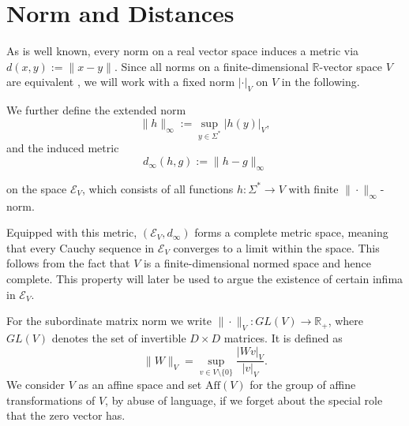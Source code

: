 \section{Norm and Distances}
\label{ND}



As is well known, every norm on a real vector space induces a metric via \( d(x, y) := \|x - y\| \).  
Since all norms on a finite-dimensional \(\mathbb{R}\)-vector space \(V\) are equivalent \cite{lang_algebra_2002}, we will work with a fixed norm \(|\cdot|_V\) on \(V\) in the following.



We further define the extended norm
\[
\|h\|_\infty := \sup_{y \in \Sigma^*} |h(y)|_V,
\]
and the induced metric
\[
d_\infty(h, g) := \|h - g\|_\infty
\]

on the space \(\mathcal{E}_V\), which consists of all functions \(h : \Sigma^* \to V\) with finite \(\|\cdot\|_\infty\)-norm.

Equipped with this metric, \((\mathcal{E}_V, d_\infty)\) forms a complete metric space, meaning that every Cauchy sequence in \(\mathcal{E}_V\) converges to a limit within the space.  
This follows from the fact that \(V\) is a finite-dimensional normed space and hence complete.
This property will later be used to argue the existence of certain infima in \(\mathcal{E}_V\).



For the subordinate matrix norm we write $\|\cdot\|_V: GL(V) \rightarrow \mathbb{R}_+$, where $GL(V)$ denotes the set of invertible $D\times D $ matrices.
It is defined as \[\|W\|_V=\sup_{v\in V\setminus \{0\}}\frac{|W v|_V}{|v|_V}.\]
We consider $V$ as an affine space and set $\text{Aff}(V)$ for the group of affine transformations of $V$, by abuse of language, if we forget about the special role that the zero vector has.

